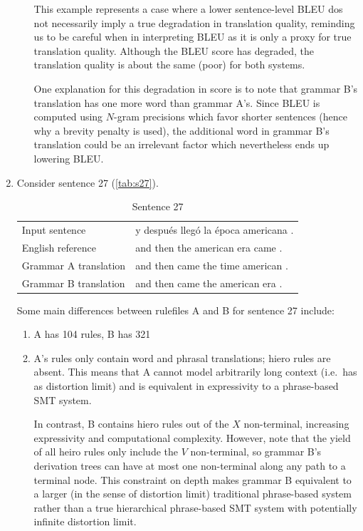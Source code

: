 \documentclass[a4paper,oneside,reqno]{amsart}
\begin{document}
\begin{enumerate}[label=\arabic*.]
\begin{enumerate}[label=(\alph*)]
         This example represents a case where a lower sentence-level BLEU dos
         not necessarily imply a true degradation in translation quality,
         reminding us to be careful when in interpreting BLEU as it is only a
         proxy for true translation quality. Although the BLEU score has
         degraded, the translation quality is about the same (poor) for both systems.

        One explanation for this degradation in score is to note that grammar B's
        translation has one more word than grammar A's. Since BLEU is computed using
        $N$-gram precisions which favor shorter sentences (hence why a brevity penalty
        is used), the additional word in grammar B's translation could be an irrelevant
        factor which nevertheless ends up lowering BLEU.
    \end{enumerate}

  \item
    Consider sentence 27 (\autoref{tab:s27}).
    \begin{table}[H]
      \begin{tabular}{p{5cm}p{10cm}}
        Input sentence & y después llegó la época americana .  \\
            English reference & and then the american era came .  \\
            Grammar A translation & and then came the time american .  \\
            Grammar B translation & and then came the american era .  \\
      \end{tabular}
          \caption{Sentence 27}
          \label{tab:s27}
    \end{table}
    Some main differences between rulefiles A and B for sentence 27 include:
    \begin{enumerate}
      \item A has 104 rules, B has 321
      \item A's rules only contain word and phrasal translations; hiero rules
        are absent.  This means that A cannot model arbitrarily long context
        (i.e.\ has as distortion limit) and is equivalent in expressivity to a
        phrase-based SMT system.

        In contrast, B contains hiero rules out of the $X$ non-terminal,
        increasing expressivity and computational complexity. However, note
        that the yield of all heiro rules only include the $V$ non-terminal, so
        grammar B's derivation trees can have at most one non-terminal along
        any path to a terminal node. This constraint on depth makes grammar B
        equivalent to a larger (in the sense of distortion limit) traditional
        phrase-based system rather than a true hierarchical phrase-based SMT
        system with potentially infinite distortion limit.
    \end{enumerate}


\end{enumerate}
\end{document}
